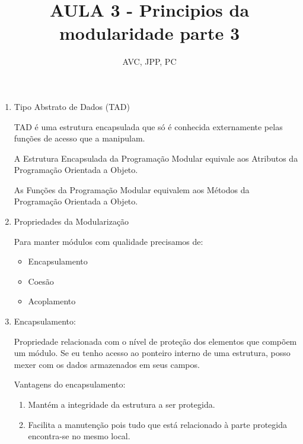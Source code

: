 \documentclass[
	12pt, %
]{fphw}
\title{AULA 3 - Principios da modularidade parte 3} %
\author{AVC, JPP, PC} %
\date{} %
\institute{Pontifícia Universidade Católica do Rio de Janeiro \\ Departamento de Informática} %
\begin{document}
\maketitle %

\begin{doublespace}

    \begin{enumerate}

        \item Tipo Abstrato de Dados (TAD)

              TAD é uma estrutura encapsulada que só é conhecida externamente pelas funções de acesso que a manipulam.

              A Estrutura Encapsulada da Programação Modular equivale aos Atributos da Programação Orientada a Objeto.

              As Funções da Programação Modular equivalem aos Métodos da Programação Orientada a Objeto.

        \item Propriedades da Modularização

              Para manter módulos com qualidade precisamos de:

              \begin{itemize}
                  \item Encapsulamento
                  \item Coesão
                  \item Acoplamento
              \end{itemize}

        \item Encapsulamento:

              Propriedade relacionada com o nível de proteção dos elementos que compõem um módulo. Se eu tenho acesso ao ponteiro interno de uma estrutura, posso mexer com os dados armazenados em seus campos.

              Vantagens do encapsulamento:

              \begin{enumerate}

                  \item Mantém a integridade da estrutura a ser protegida.
                  \item Facilita a manutenção pois tudo que está relacionado à parte protegida encontra-se no mesmo local.


\end{enumerate}
\end{enumerate}
\end{doublespace}
\end{document}
